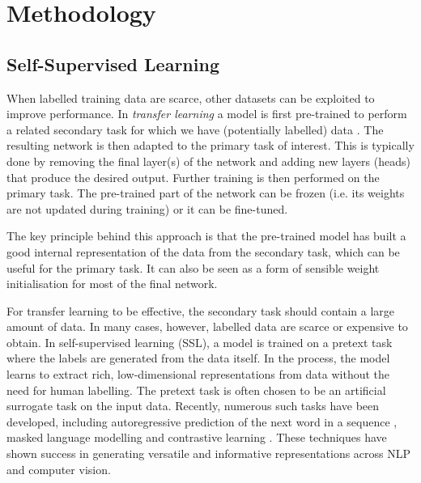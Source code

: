 \documentclass[a4paper,12pt]{article}
\begin{document}
\section{Methodology}
\subsection{Self-Supervised Learning}
When labelled training data are scarce, other datasets can be exploited to improve performance. In \emph{transfer learning} a model is first pre-trained to perform a related secondary task for which we have (potentially labelled) data \cite{udl}. The resulting network is then adapted to the primary task of interest. This is typically done by removing the final layer(s) of the network and adding new layers (heads) that produce the desired output. Further training is then performed on the primary task. The pre-trained part of the network can be frozen (i.e. its weights are not updated during training) or it can be fine-tuned. 

The key principle behind this approach is that the pre-trained model has built a good internal representation of the data from the secondary task, which can be useful for the primary task. It can also be seen as a form of sensible weight initialisation for most of the final network.

For transfer learning to be effective, the secondary task should contain a large amount of data. In many cases, however, labelled data are scarce or expensive to obtain. In self-supervised learning (SSL), a model is trained on a pretext task where the labels are generated from the data itself. In the process, the model learns to extract rich, low-dimensional representations from data without the need for human labelling. The pretext task is often chosen to be an artificial surrogate task on the input data. Recently, numerous such tasks have been developed, including autoregressive prediction of the next word in a sequence \cite{radford2019language}, masked language modelling \cite{devlin2018bert} and contrastive learning \cite{radford2021learning}. These techniques have shown success in generating versatile and informative representations across NLP and computer vision.
\end{document}
